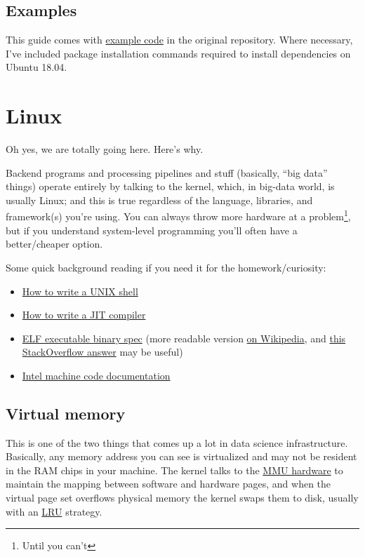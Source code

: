 \documentclass{article}
\newcommand{\lnk}[2]{\href{#1}{\textcolor[rgb]{1.0,0.0,0.0}{#2}}}
\begin{document}
  \subsection*{Examples}
  This guide comes with
  \lnk{https://github.com/spencertipping/data-science-in-ten-minutes/tree/master/example}{example
  code} in the original repository. Where necessary, I've included package
  installation commands required to install dependencies on Ubuntu 18.04.

  \newpage
  \section{Linux}
  Oh yes, we are totally going here. Here's why.

  Backend programs and processing pipelines and stuff (basically, ``big data''
  things) operate entirely by talking to the kernel, which, in big-data world,
  is usually Linux; and this is true regardless of the language, libraries, and
  framework(s) you're using. You can always throw more hardware at a
  problem\footnote{Until you can't}, but if you understand system-level
  programming you'll often have a better/cheaper option.

  Some quick background reading if you need it for the homework/curiosity:

  \begin{itemize}
    \item \lnk{https://github.com/spencertipping/shell-tutorial}
              {How to write a UNIX shell}
    \item \lnk{https://github.com/spencertipping/jit-tutorial}
              {How to write a JIT compiler}
    \item \lnk{http://manpages.ubuntu.com/manpages/xenial/man5/elf.5.html}
              {ELF executable binary spec} (more readable version
              \lnk{https://en.wikipedia.org/wiki/Executable_and_Linkable_Format}
              {on Wikipedia}, and
              \lnk{https://stackoverflow.com/questions/2427011/what-is-the-difference-between-elf-files-and-bin-files}
                  {this StackOverflow answer} may be useful)
    \item \lnk{https://www.intel.com/content/dam/www/public/us/en/documents/manuals/64-ia-32-architectures-software-developer-instruction-set-reference-manual-325383.pdf}
              {Intel machine code documentation}
  \end{itemize}

  \subsection{Virtual memory}
  This is one of the two things that comes up a lot in data science
  infrastructure. Basically, any memory address you can see is virtualized and
  may not be resident in the RAM chips in your machine. The kernel talks to the
  \lnk{https://en.wikipedia.org/wiki/Memory_management_unit}{MMU hardware} to
  maintain the mapping between software and hardware pages, and when the virtual
  page set overflows physical memory the kernel swaps them to disk, usually with
  an \lnk{https://en.wikipedia.org/wiki/Cache_replacement_policies}{LRU}
  strategy.
\end{document}
